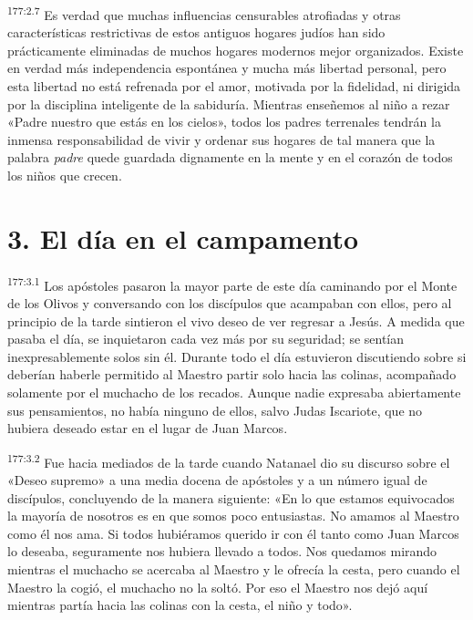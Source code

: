 \par 
\textsuperscript{177:2.7} Es verdad que muchas influencias censurables atrofiadas y otras características restrictivas de estos antiguos hogares judíos han sido prácticamente eliminadas de muchos hogares modernos mejor organizados. Existe en verdad más independencia espontánea y mucha más libertad personal, pero esta libertad no está refrenada por el amor, motivada por la fidelidad, ni dirigida por la disciplina inteligente de la sabiduría. Mientras enseñemos al niño a rezar «Padre nuestro que estás en los cielos», todos los padres terrenales tendrán la inmensa responsabilidad de vivir y ordenar sus hogares de tal manera que la palabra \textit{padre} quede guardada dignamente en la mente y en el corazón de todos los niños que crecen.

\section*{3. El día en el campamento}
\par 
\textsuperscript{177:3.1} Los apóstoles pasaron la mayor parte de este día caminando por el Monte de los Olivos y conversando con los discípulos que acampaban con ellos, pero al principio de la tarde sintieron el vivo deseo de ver regresar a Jesús. A medida que pasaba el día, se inquietaron cada vez más por su seguridad; se sentían inexpresablemente solos sin él. Durante todo el día estuvieron discutiendo sobre si deberían haberle permitido al Maestro partir solo hacia las colinas, acompañado solamente por el muchacho de los recados. Aunque nadie expresaba abiertamente sus pensamientos, no había ninguno de ellos, salvo Judas Iscariote, que no hubiera deseado estar en el lugar de Juan Marcos.

\par 
\textsuperscript{177:3.2} Fue hacia mediados de la tarde cuando Natanael dio su discurso sobre el «Deseo supremo» a una media docena de apóstoles y a un número igual de discípulos, concluyendo de la manera siguiente: «En lo que estamos equivocados la mayoría de nosotros es en que somos poco entusiastas. No amamos al Maestro como él nos ama. Si todos hubiéramos querido ir con él tanto como Juan Marcos lo deseaba, seguramente nos hubiera llevado a todos. Nos quedamos mirando mientras el muchacho se acercaba al Maestro y le ofrecía la cesta, pero cuando el Maestro la cogió, el muchacho no la soltó. Por eso el Maestro nos dejó aquí mientras partía hacia las colinas con la cesta, el niño y todo».

